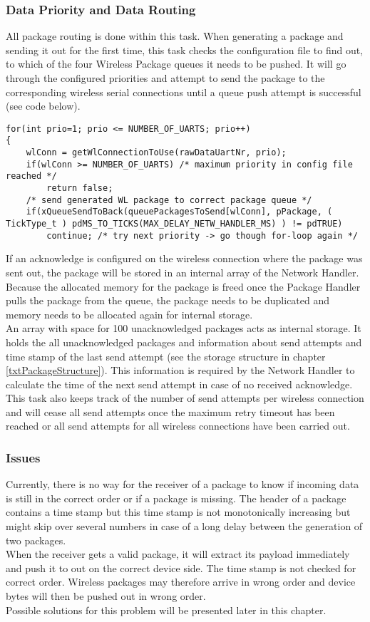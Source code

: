\subsubsection{Data Priority and Data Routing}
All package routing is done within this task. When generating a package and sending it out for the first time, this task checks the configuration file to find out, to which of the four Wireless Package queues it needs to be pushed. It will go through the configured priorities and attempt to send the package to the corresponding wireless serial connections until a queue push attempt is successful (see code below).
\begin{lstlisting}
for(int prio=1; prio <= NUMBER_OF_UARTS; prio++)
{
    wlConn = getWlConnectionToUse(rawDataUartNr, prio);
    if(wlConn >= NUMBER_OF_UARTS) /* maximum priority in config file reached */
        return false;
    /* send generated WL package to correct package queue */
    if(xQueueSendToBack(queuePackagesToSend[wlConn], pPackage, ( TickType_t ) pdMS_TO_TICKS(MAX_DELAY_NETW_HANDLER_MS) ) != pdTRUE)
        continue; /* try next priority -> go though for-loop again */
\end{lstlisting}
If an acknowledge is configured on the wireless connection where the package was sent out, the package will be stored in an internal array of the Network Handler. Because the allocated memory for the package is freed once the Package Handler pulls the package from the queue, the package needs to be duplicated and memory needs to be allocated again for internal storage.\\
An array with space for 100 unacknowledged packages acts as internal storage. It holds the all unacknowledged packages and information about send attempts and time stamp of the last send attempt (see the storage structure in chapter \ref{txtPackageStructure}). This information is required by the Network Handler to calculate the time of the next send attempt in case of no received acknowledge. This task also keeps track of the number of send attempts per wireless connection and will cease all send attempts once the maximum retry timeout has been reached or all send attempts for all wireless connections have been carried out.
\subsubsection{Issues}
Currently, there is no way for the receiver of a package to know if incoming data is still in the correct order or if a package is missing. The header of a package contains a time stamp but this time stamp is not monotonically increasing but might skip over several numbers in case of a long delay between the generation of two packages.\\
When the receiver gets a valid package, it will extract its payload immediately and push it to out on the correct device side. The time stamp is not checked for correct order. Wireless packages may therefore arrive in wrong order and device bytes will then be pushed out in wrong order.\\
Possible solutions for this problem will be presented later in this chapter.\\
%
%
